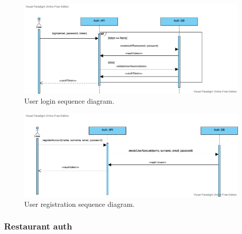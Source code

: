 \begin{figure}
    \includegraphics[width=\linewidth]{../docs/sequence/userAuth/auth.png}
    \caption{User login sequence diagram.}
    \label{fig:user_login}
\end{figure}

\begin{figure}
    \includegraphics[width=\linewidth]{../docs/sequence/userRegistration/registerUser.png}
    \caption{User registration sequence diagram.}
    \label{fig:user_registration}
\end{figure}

\subsubsection{Restaurant auth}

